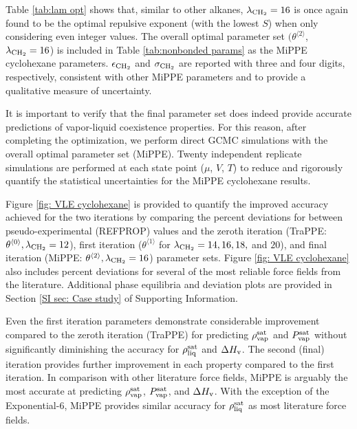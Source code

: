 \documentclass[journal=jced,manuscript=article]{achemso}
\begin{document}

Table \ref{tab:lam opt} shows that, similar to other alkanes, $\lambda_{\rm CH_2} = 16$ is once again found to be the optimal repulsive exponent (with the lowest $S$) when only considering even integer values. The overall optimal parameter set $(\theta^{\langle2\rangle}$, $\lambda_{\rm CH_2} = 16$) is included in Table \ref{tab:nonbonded params} as the MiPPE cyclohexane parameters. $\epsilon_{\rm CH_2}$ and $\sigma_{\rm CH_2}$ are reported with three and four digits, respectively, consistent with other MiPPE parameters and to provide a qualitative measure of uncertainty.  

It is important to verify that the final parameter set does indeed provide accurate predictions of vapor-liquid coexistence properties. For this reason, after completing the optimization, we perform direct GCMC simulations with the overall optimal parameter set (MiPPE). Twenty independent replicate simulations are performed at each state point ($\mu$, $V$, $T$) to reduce and rigorously quantify the statistical uncertainties for the MiPPE cyclohexane results. 

Figure \ref{fig: VLE cyclohexane} is provided to quantify the improved accuracy achieved for the two iterations by comparing the percent deviations for between pseudo-experimental (REFPROP) values and the zeroth iteration (TraPPE: $\theta^{\langle0\rangle}, \lambda_{\rm CH_2} = 12$), first iteration ($\theta^{\langle1\rangle}$ for $\lambda_{\rm CH_2} = 14, 16, 18,$ and $20$), and final iteration (MiPPE: $\theta^{\langle2\rangle}, \lambda_{\rm CH_2} = 16$) parameter sets. Figure \ref{fig: VLE cyclohexane} also includes percent deviations for several of the most reliable force fields from the literature.\cite{Errington1999,Eckl2008,Bourasseau2002CYC6,Mauricio2015,Keasler2012,Yiannourakou2019} Additional phase equilibria and deviation plots are provided in Section \ref{SI sec: Case study} of Supporting Information.

Even the first iteration parameters demonstrate considerable improvement compared to the zeroth iteration (TraPPE) for predicting $\rho_{\rm vap}^{\rm sat}$ and $P_{\rm vap}^{\rm sat}$ without significantly diminishing the accuracy for $\rho_{\rm liq}^{\rm sat}$ and $\Delta H_{\rm v}$. The second (final) iteration provides further improvement in each property compared to the first iteration. In comparison with other literature force fields, MiPPE is arguably the most accurate at predicting $\rho_{\rm vap}^{\rm sat}$, $P_{\rm vap}^{\rm sat}$, and $\Delta H_{\rm v}$. With the exception of the Exponential-6, \cite{Exp6} MiPPE provides similar accuracy for $\rho_{\rm liq}^{\rm sat}$ as most literature force fields.
\end{document}
